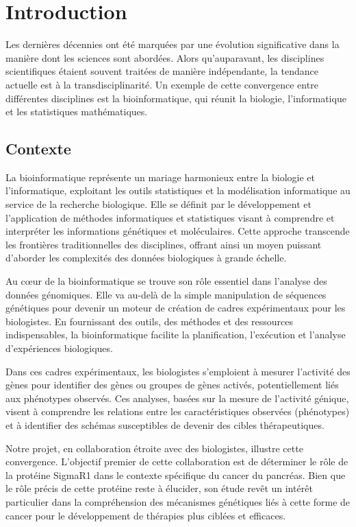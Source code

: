 \setcounter{secnumdepth}{1}

\chapter{Introduction}
Les dernières décennies ont été marquées par une évolution significative dans la manière dont les sciences sont abordées. Alors qu'auparavant, les disciplines scientifiques étaient souvent traitées de manière indépendante, la tendance actuelle est à la transdisciplinarité. Un exemple de cette convergence entre différentes disciplines est la bioinformatique, qui réunit la biologie, l'informatique et les statistiques mathématiques.
\section{Contexte}

La bioinformatique représente un mariage harmonieux entre la biologie et l'informatique, exploitant les outils statistiques et la modélisation informatique au service de la recherche biologique. Elle se définit par le développement et l'application de méthodes informatiques et statistiques visant à comprendre et interpréter les informations génétiques et moléculaires. Cette approche transcende les frontières traditionnelles des disciplines, offrant ainsi un moyen puissant d'aborder les complexités des données biologiques à grande échelle.

Au cœur de la bioinformatique se trouve son rôle essentiel dans l'analyse des données génomiques. Elle va au-delà de la simple manipulation de séquences génétiques pour devenir un moteur de création de cadres expérimentaux pour les biologistes. En fournissant des outils, des méthodes et des ressources indispensables, la bioinformatique facilite la planification, l'exécution et l'analyse d'expériences biologiques.

Dans ces cadres expérimentaux, les biologistes s'emploient à mesurer l'activité des gènes pour identifier des gènes ou groupes de gènes activés, potentiellement liés aux phénotypes observés. Ces analyses, basées sur la mesure de l'activité génique, visent à comprendre les relations entre les caractéristiques observées (phénotypes) et à identifier des schémas susceptibles de devenir des cibles thérapeutiques.

Notre projet, en collaboration étroite avec des biologistes, illustre cette convergence. L'objectif premier de cette collaboration est de déterminer le rôle de la protéine SigmaR1 dans le contexte spécifique du cancer du pancréas. Bien que le rôle précis de cette protéine reste à élucider, son étude revêt un intérêt particulier dans la compréhension des mécanismes génétiques liés à cette forme de cancer pour le développement de thérapies plus ciblées et efficaces.

